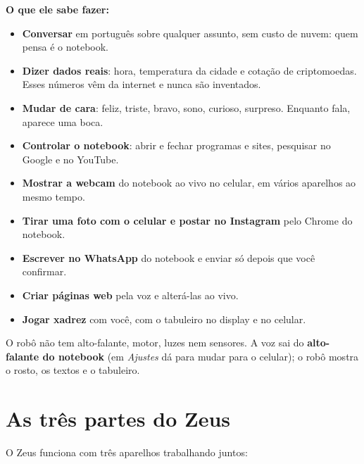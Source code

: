 \documentclass[11pt,a4paper]{article}
\begin{document}
\textbf{O que ele sabe fazer:}
\begin{itemize}
  \item \textbf{Conversar} em português sobre qualquer assunto, sem custo de nuvem: quem pensa é o notebook.
  \item \textbf{Dizer dados reais}: hora, temperatura da cidade e cotação de criptomoedas. Esses números
        vêm da internet e nunca são inventados.
  \item \textbf{Mudar de cara}: feliz, triste, bravo, sono, curioso, surpreso. Enquanto fala, aparece uma boca.
  \item \textbf{Controlar o notebook}: abrir e fechar programas e sites, pesquisar no Google e no YouTube.
  \item \textbf{Mostrar a webcam} do notebook ao vivo no celular, em vários aparelhos ao mesmo tempo.
  \item \textbf{Tirar uma foto com o celular e postar no Instagram} pelo Chrome do notebook.
  \item \textbf{Escrever no WhatsApp} do notebook e enviar só depois que você confirmar.
  \item \textbf{Criar páginas web} pela voz e alterá-las ao vivo.
  \item \textbf{Jogar xadrez} com você, com o tabuleiro no display e no celular.
\end{itemize}

\begin{nota}
O robô não tem alto-falante, motor, luzes nem sensores. A voz sai do \textbf{alto-falante do
notebook} (em \emph{Ajustes} dá para mudar para o celular); o robô mostra o rosto, os textos e o
tabuleiro.
\end{nota}

\section{As três partes do Zeus}

O Zeus funciona com três aparelhos trabalhando juntos:
\end{document}
